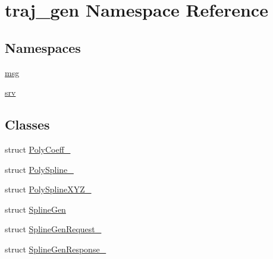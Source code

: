 \hypertarget{namespacetraj__gen}{}\section{traj\+\_\+gen Namespace Reference}
\label{namespacetraj__gen}
\subsection*{Namespaces}
\begin{DoxyCompactItemize}
\item 
 \hyperlink{namespacetraj__gen_1_1msg}{msg}
\item 
 \hyperlink{namespacetraj__gen_1_1srv}{srv}
\end{DoxyCompactItemize}
\subsection*{Classes}
\begin{DoxyCompactItemize}
\item 
struct \hyperlink{structtraj__gen_1_1_poly_coeff__}{Poly\+Coeff\+\_\+}
\item 
struct \hyperlink{structtraj__gen_1_1_poly_spline__}{Poly\+Spline\+\_\+}
\item 
struct \hyperlink{structtraj__gen_1_1_poly_spline_x_y_z__}{Poly\+Spline\+X\+Y\+Z\+\_\+}
\item 
struct \hyperlink{structtraj__gen_1_1_spline_gen}{Spline\+Gen}
\item 
struct \hyperlink{structtraj__gen_1_1_spline_gen_request__}{Spline\+Gen\+Request\+\_\+}
\item 
struct \hyperlink{structtraj__gen_1_1_spline_gen_response__}{Spline\+Gen\+Response\+\_\+}
\end{DoxyCompactItemize}
